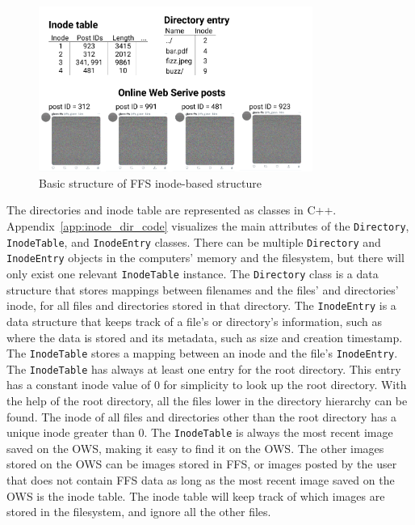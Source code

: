\begin{figure}[!ht]
	\begin{center}
	  \includegraphics[width=0.8\textwidth]{figures.nosync/ffs_inode_diagram.png}
	\end{center}
	\caption{Basic structure of \gls{FFS} \mbox{inode-based} structure}
	\label{fig:ffs_inode_diag}
\end{figure}

The directories and inode table are represented as classes in C++. Appendix~\ref{app:inode_dir_code} visualizes the main attributes of the \texttt{Directory}, \texttt{InodeTable}, and \texttt{InodeEntry} classes. There can be multiple \texttt{Directory} and \texttt{InodeEntry} objects in the computers' memory and the filesystem, but there will only exist one relevant \texttt{InodeTable} instance. The \texttt{Directory} class is a data structure that stores mappings between filenames and the files' and directories' inode, for all files and directories stored in that directory. The \texttt{InodeEntry} is a data structure that keeps track of a file's or directory's information, such as where the data is stored and its metadata, such as size and creation timestamp. The \texttt{InodeTable} stores a mapping between an inode and the file's \texttt{InodeEntry}. The \texttt{InodeTable} has always at least one entry for the root directory. This entry has a constant inode value of 0 for simplicity to look up the root directory. With the help of the root directory, all the files lower in the directory hierarchy can be found. The inode of all files and directories other than the root directory has a unique inode greater than 0. The \texttt{InodeTable} is always the most recent image saved on the \gls{OWS}, making it easy to find it on the \gls{OWS}. The other images stored on the \gls{OWS} can be images stored in \gls{FFS}, or images posted by the user that does not contain \gls{FFS} data as long as the most recent image saved on the \gls{OWS} is the inode table. The inode table will keep track of which images are stored in the filesystem, and ignore all the other files.

